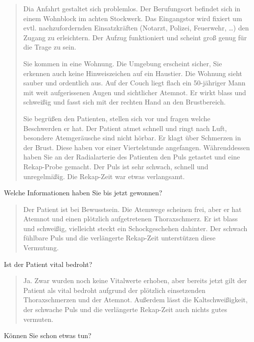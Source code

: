 \begin{quote}
  Dia Anfahrt gestaltet sich problemlos. Der
  Berufungsort befindet sich in einem Wohnblock im achten Stockwerk. Das
  Eingangstor wird fixiert um evtl. nachzufordernden Einsatzkräften (Notarzt,
  Polizei, Feuerwehr, \ldots ) den Zugang zu erleichtern. Der Aufzug
  funktioniert und scheint groß genug für die Trage zu sein. 
  
  Sie kommen in eine Wohnung. Die Umgebung erscheint sicher, Sie erkennen auch
  keine Hinweiszeichen auf ein Haustier. Die Wohnung sieht sauber und ordentlich
  aus. Auf der Couch liegt flach ein 50-jähriger Mann mit weit aufgerissenen Augen und
  sichtlicher Atemnot. Er wirkt blass und schweißig und fasst sich mit der
  rechten Hand an den Brustbereich.
  
  Sie begrüßen den Patienten, stellen sich vor und
  fragen welche Beschwerden er hat. Der Patient
  atmet schnell und ringt nach Luft, besondere
  Atemgeräusche sind nicht hörbar. Er klagt über Schmerzen in der Brust. Diese
  haben vor einer Viertelstunde angefangen. Währenddessen
  haben Sie an der Radialarterie des Patienten den Puls getastet und eine
  Rekap-Probe gemacht. Der Puls ist sehr schwach, schnell und unregelmäßig. Die
  Rekap-Zeit war etwas verlangsamt.
\end{quote}

Welche Informationen haben Sie bis jetzt gewonnen?
\begin{quote}
  Der Patient ist bei Bewusstsein. Die Atemwege scheinen frei, aber er hat
  Atemnot und einen plötzlich aufgetretenen Thoraxschmerz. Er ist blass und
  schweißig, vielleicht steckt ein Schockgeschehen dahinter. Der schwach fühlbare
  Puls und die verlängerte Rekap-Zeit unterstützen diese Vermutung.
\end{quote}

Ist der Patient vital bedroht?
\begin{quote}
  Ja. Zwar wurden noch keine Vitalwerte erhoben, aber bereits
  jetzt gilt der Patient als vital bedroht aufgrund der plötzlich einsetzenden
  Thoraxschmerzen und der Atemnot. Außerdem lässt die Kaltschweißigkeit, der
  schwache Puls und die verlängerte Rekap-Zeit auch nichts gutes vermuten.
\end{quote}

Können Sie schon etwas tun?

